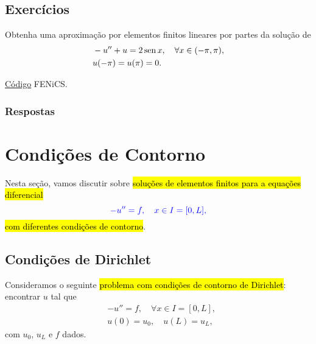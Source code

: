 \subsection{Exercícios}
\badgeRevisar

\begin{exer}\label{exer:dc}
  Obtenha uma aproximação por elementos finitos lineares por partes da solução de
  \begin{align}
    &-u'' + u = 2\operatorname{sen} x,\quad \forall x\in (-\pi, \pi),\\
    &u(-\pi)=u(\pi)=0.
  \end{align}
\end{exer}
\begin{resp}
  \ifispython
  \href{https://github.com/phkonzen/notas/blob/master/src/MetodoElementosFinitos/cap_mef1d/dados/exer_dc/exer_dc.py}{Código} FENiCS.
  \fi
\end{resp}

\ifisbook
\subsubsection{Respostas}
\shipoutAnswer
\fi


\section{Condições de Contorno}\label{cap_mef1d_sec_cc}
\badgeRevisar

Nesta seção, vamos discutir sobre \hl{soluções de elementos finitos para a equações diferencial}
\begin{equation}\color{blue}-u'' = f,\quad x\in I=[0, L],
\end{equation}
\hl{com diferentes condições de contorno}.

\subsection{Condições de Dirichlet}
\badgeRevisar

Consideramos o seguinte \hl{problema com condições de contorno de Dirichlet}{\dirichlet}: encontrar $u$ tal que
\begin{align}
  &-u'' = f,\quad \forall x\in I=[0, L],\label{eq:cc_d_eq}\\
  &u(0) = u_0,\quad u(L) = u_L,\label{eq:cc_d_bc}
\end{align}
com $u_0$, $u_L$ e $f$ dados.

